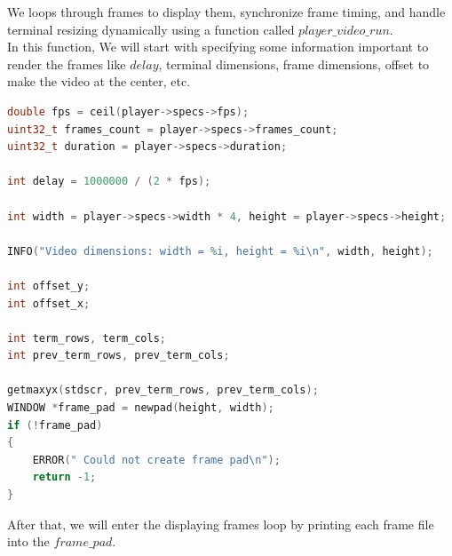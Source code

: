 \documentclass[a4paper,12pt]{article}
\begin{document}
\newpage
We loops through frames to display them, synchronize frame timing, and handle terminal resizing dynamically using a function called $player\_video\_run$.\\

In this function, We will start with specifying some information important to render the frames like $delay$, terminal dimensions, frame dimensions, offset to make the video at the center, etc.

\begin{lstlisting}[language=c]
double fps = ceil(player->specs->fps);
uint32_t frames_count = player->specs->frames_count;
uint32_t duration = player->specs->duration;

int delay = 1000000 / (2 * fps);

int width = player->specs->width * 4, height = player->specs->height;

INFO("Video dimensions: width = %i, height = %i\n", width, height);

int offset_y;
int offset_x;

int term_rows, term_cols;
int prev_term_rows, prev_term_cols;

getmaxyx(stdscr, prev_term_rows, prev_term_cols);
WINDOW *frame_pad = newpad(height, width);
if (!frame_pad)
{
    ERROR(" Could not create frame pad\n");
    return -1;
}
\end{lstlisting}

After that, we will enter the displaying frames loop by printing each frame file into the $frame\_pad$.
\end{document}
